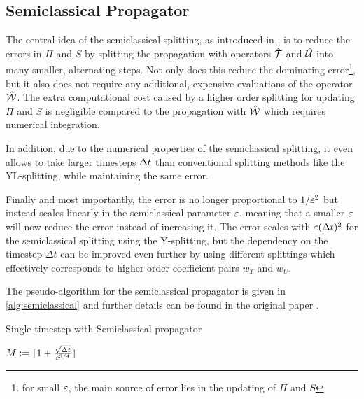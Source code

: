 \subsection{Semiclassical Propagator}
\label{sub:semiclassical_propagator}
%
The central idea of the semiclassical splitting, as introduced in \cite{GH_convsemiclassical},
is to reduce the errors in $\Pi$ and $S$ by splitting the propagation with operators
$\hat{\mathcal{T}}$ and $\hat{\mathcal{U}}$ into many smaller, alternating steps.
Not only does this reduce the dominating error\footnote{for small $\varepsilon$,
the main source of error lies in the updating of $\Pi$ and $S$},
but it also does not require any additional, expensive evaluations of the operator $\hat{\mathcal{W}}$.
The extra computational cost caused by a higher order splitting for updating $\Pi$ and $S$
is negligible compared to the propagation with $\hat{\mathcal{W}}$ which requires numerical integration. 
\par\medskip
%
In addition, due to the numerical properties of the semiclassical splitting, 
it even allows to take larger timesteps $\Delta t$ than conventional
splitting methods like the YL-splitting, while maintaining the same error.
\par\medskip
%
Finally and most importantly, the error is no longer proportional to $1/\varepsilon^2$ but instead
scales linearly in the semiclassical parameter $\varepsilon$,
meaning that a smaller $\varepsilon$ will now reduce the error instead of increasing it.
The error scales with $\varepsilon (\Delta t)^2$ for the semiclassical splitting using the Y-splitting,
but the dependency on the timestep $\Delta t$ can be improved even further by using different
splittings which effectively corresponds to higher order coefficient pairs $w_T$ and $w_U$.
\par\medskip
%
The pseudo-algorithm for the semiclassical propagator is given in \ref{alg:semiclassical} and 
further details can be found in the original paper \cite{GH_convsemiclassical}.
%
\begin{algorithm}[h]
	\caption{Single timestep with Semiclassical propagator}
	\label{alg:semiclassical}
	\begin{algorithmic}
		\State
		\State $M := \lceil 1 + \frac{\sqrt{\Delta t}}{\varepsilon^{3/4}} \rceil$
		\State
		\State {}
		\State {}
		\State {}
		\State
	\EndProcedure
	\end{algorithmic}
\end{algorithm}


